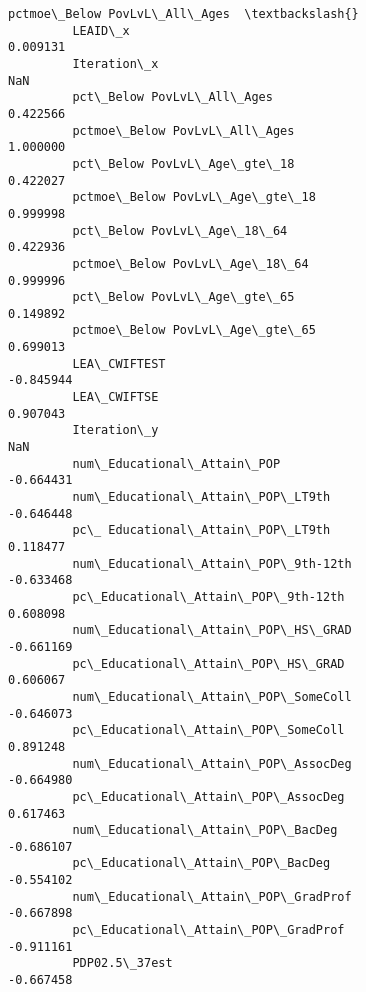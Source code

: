 \documentclass[11pt]{article}
\begin{document}
\begin{Verbatim}[commandchars=\\\{\}]
                                                    pctmoe\_Below PovLvL\_All\_Ages  \textbackslash{}
         LEAID\_x                                                        0.009131   
         Iteration\_x                                                         NaN   
         pct\_Below PovLvL\_All\_Ages                                      0.422566   
         pctmoe\_Below PovLvL\_All\_Ages                                   1.000000   
         pct\_Below PovLvL\_Age\_gte\_18                                    0.422027   
         pctmoe\_Below PovLvL\_Age\_gte\_18                                 0.999998   
         pct\_Below PovLvL\_Age\_18\_64                                     0.422936   
         pctmoe\_Below PovLvL\_Age\_18\_64                                  0.999996   
         pct\_Below PovLvL\_Age\_gte\_65                                    0.149892   
         pctmoe\_Below PovLvL\_Age\_gte\_65                                 0.699013   
         LEA\_CWIFTEST                                                  -0.845944   
         LEA\_CWIFTSE                                                    0.907043   
         Iteration\_y                                                         NaN   
         num\_Educational\_Attain\_POP                                    -0.664431   
         num\_Educational\_Attain\_POP\_LT9th                              -0.646448   
         pc\_ Educational\_Attain\_POP\_LT9th                               0.118477   
         num\_Educational\_Attain\_POP\_9th-12th                           -0.633468   
         pc\_Educational\_Attain\_POP\_9th-12th                             0.608098   
         num\_Educational\_Attain\_POP\_HS\_GRAD                            -0.661169   
         pc\_Educational\_Attain\_POP\_HS\_GRAD                              0.606067   
         num\_Educational\_Attain\_POP\_SomeColl                           -0.646073   
         pc\_Educational\_Attain\_POP\_SomeColl                             0.891248   
         num\_Educational\_Attain\_POP\_AssocDeg                           -0.664980   
         pc\_Educational\_Attain\_POP\_AssocDeg                             0.617463   
         num\_Educational\_Attain\_POP\_BacDeg                             -0.686107   
         pc\_Educational\_Attain\_POP\_BacDeg                              -0.554102   
         num\_Educational\_Attain\_POP\_GradProf                           -0.667898   
         pc\_Educational\_Attain\_POP\_GradProf                            -0.911161   
         PDP02.5\_37est                                                 -0.667458   

\end{Verbatim}
\end{document}
